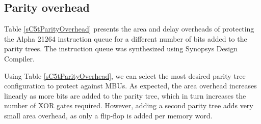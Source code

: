 \documentclass[12pt]{yalephd}
\begin{document}
\subsection{Parity overhead}\label{sC5sAreaOverhead}

Table \ref{sC5tParityOverhead} presents the area and delay overheads of protecting the Alpha 21264 instruction queue for a different number of bits added to the parity trees. The instruction queue was synthesized using Synopsys Design Compiler.

 Using Table \ref{sC5tParityOverhead}, we can select the most desired parity tree configuration to protect against MBUs. As expected, the area overhead increases linearly as more bits are added to the parity tree, which in turn increases the number of XOR gates required. However, adding a second parity tree adds very small area overhead, as only a flip-flop is added per memory word.
\end{document}
